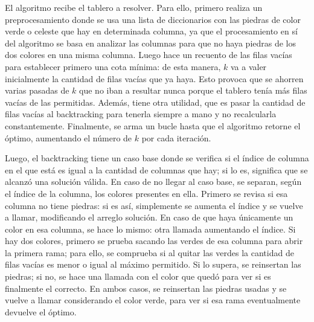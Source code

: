 El algoritmo recibe el tablero a resolver. Para ello, primero realiza un preprocesamiento donde se usa una lista de diccionarios con las piedras de color verde o celeste que hay en determinada columna, ya que el procesamiento en sí del algoritmo se basa en analizar las columnas para que no haya piedras de los dos colores en una misma columna. Luego hace un recuento de las filas vacías para establecer primero una cota mínima: de esta manera, $k$ va a valer inicialmente la cantidad de filas vacías que ya haya. Esto provoca que se ahorren varias pasadas de $k$ que no iban a resultar nunca porque el tablero tenía más filas vacías de las permitidas. Además, tiene otra utilidad, que es pasar la cantidad de filas vacías al backtracking para tenerla siempre a mano y no recalcularla constantemente. Finalmente, se arma un bucle hasta que el algoritmo retorne el óptimo, aumentando el número de $k$ por cada iteración.

Luego, el backtracking tiene un caso base donde se verifica si el índice de columna en el que está es igual a la cantidad de columnas que hay; si lo es, significa que se alcanzó una solución válida. En caso de no llegar al caso base, se separan, según el índice de la columna, los colores presentes en ella. Primero se revisa si esa columna no tiene piedras: si es así, simplemente se aumenta el índice y se vuelve a llamar, modificando el arreglo solución. En caso de que haya únicamente un color en esa columna, se hace lo mismo: otra llamada aumentando el índice. Si hay dos colores, primero se prueba sacando las verdes de esa columna para abrir la primera rama; para ello, se comprueba si al quitar las verdes la cantidad de filas vacías es menor o igual al máximo permitido. Si lo supera, se reinsertan las piedras; si no, se hace una llamada con el color que quedó para ver si es finalmente el correcto. En ambos casos, se reinsertan las piedras usadas y se vuelve a llamar considerando el color verde, para ver si esa rama eventualmente devuelve el óptimo.

